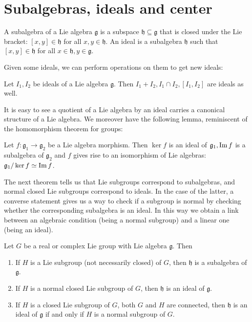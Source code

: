 \documentclass{report}
\begin{document}
\section{Subalgebras, ideals and center}
\begin{definition}
    A subalgebra of a Lie algebra $\mathfrak g$ is a subspace $\mathfrak h \subseteq \mathfrak g$ that is closed under the Lie bracket: $[x,y] \in \mathfrak h$ for all $x,y \in \mathfrak h$.
    An ideal is a subalgebra $\mathfrak h$ such that $[x,y] \in \mathfrak h$ for all $x \in \mathfrak h, y \in \mathfrak g$.
\end{definition}
Given some ideals, we can perform operations on them to get new ideals:
\begin{proposition}
    Let $I_1, I_2$ be ideals of a Lie algebra $\mathfrak g$.
    Then $I_1 + I_2, I_1 \cap I_2, [I_1, I_2]$ are ideals as well.
\end{proposition}
It is easy to see a quotient of a Lie algebra by an ideal carries a canonical structure of a Lie algebra.
We moreover have the following lemma, reminiscent of the homomorphism theorem for groups:
\begin{lemma}
    Let $f: \mathfrak g_1 \to \mathfrak g_2$ be a Lie algebra morphism.
    Then $\ker f$ is an ideal of $\mathfrak g_1, \operatorname{{\mathrm{Im}}} f$ is a subalgebra of $\mathfrak g_2$ and $f$ gives rise to an isomorphism of Lie algebras: $\mathfrak g_1/\ker f \simeq \operatorname{{\mathrm{Im}}} f$.
\end{lemma}

The next theorem tells us that Lie subgroups correspond to subalgebras, and normal closed Lie subgroups correspond to ideals.
In the case of the latter, a converse statement gives us a way to check if a subgroup is normal by checking whether the corresponding subalgebra is an ideal.
In this way we obtain a link between an algebraic condition (being a normal subgroup) and a linear one (being an ideal).
\begin{theorem}
    Let $G$ be a real or complex Lie group with Lie algebra $\mathfrak g$.
    Then
    \begin{enumerate}[label = (\roman*)]
        \item If $H$ is a Lie subgroup (not necessarily closed) of $G$, then $\mathfrak h$ is a subalgebra of $\mathfrak g$.
        \item If $H$ is a normal closed Lie subgroup of $G$, then $\mathfrak h$ is an ideal of $\mathfrak g$.
        \item If $H$ is a closed Lie subgroup of $G$, both $G$ and  $H$ are connected, then $\mathfrak h$ is an ideal of $\mathfrak g$ if and only if $H$ is a normal subgroup of $G$.
    \end{enumerate}
\end{theorem}
\end{document}
